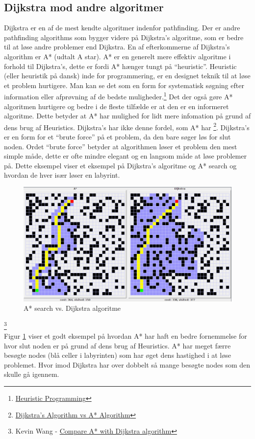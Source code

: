 \documentclass[12pt]{article}
\begin{document}
\subsection{Dijkstra mod andre algoritmer}
Dijkstra er en af de mest kendte algoritmer indenfor pathfinding. 
Der er andre pathfinding algorithms som bygger videre på Dijkstra’s algoritme, 
som er bedre til at løse andre problemer end Dijkstra. En af efterkommerne af Dijkstra’s algorithm er A* 
(udtalt A star). A* er en generelt mere effektiv algoritme i forhold til Dijkstra’s, 
dette er fordi A* hænger tungt på “heuristic”. Heuristic (eller heuristik på dansk) inde for programmering, 
er en designet teknik til at løse et problem hurtigere. Man kan se det som en form for systematisk søgning 
efter information eller afprøvning af de bedste muligheder.\footnote{\href{https://softjourn.com/insights/heuristic-programming}{Heuristic Programming}} Det der også gøre A* algoritmen hurtigere 
og bedre i de fleste tilfælde er at den er en informeret algoritme. Dette betyder at A* har mulighed for lidt 
mere infomation på grund af dens brug af Heuristics. Dijkstra’s har ikke denne fordel, som A* har \footnote{\href{https://stackabuse.com/dijkstras-algorithm-vs-a-algorithm/}{Dijkstra's Algorithm vs A* Algorithm}}. Dijkstra’s 
er en form for et “brute force” på et problem, da den bare søger løs for slut noden. 
Ordet “brute force” betyder at algorithmen løser et problem den mest simple måde, dette er ofte mindre elegant og en langsom måde at løse problemer på. 
Dette eksempel viser et eksempel på Dijkstra’s algoritme og A* 
search og hvordan de hver især løser en labyrint.  
\begin{figure}[ht]
  \includegraphics[width=\textwidth]{AstarvsDjikstra.png}
  \caption{A* search vs. Dijkstra algoritme}\label{A*vsDjikstra}
\end{figure}\footnote{Kevin Wang - \href{http://plainaslife.blogspot.com/2015/02/compare-with-dijkstra-algorithm.html}{Compare A* with Dijkstra algorithm}}
\\Figur \ref{A*vsDjikstra} viser et godt eksempel på hvordan A* har haft en bedre fornemmelse for hvor slut noden er på grund af dens brug af Heuristics. A* har meget færre besøgte nodes (blå celler i labyrinten) som har øget dens hastighed i at løse problemet. 
Hvor imod Dijkstra har over dobbelt så mange besøgte nodes som den skulle gå igennem. 
\newpage
\end{document}

